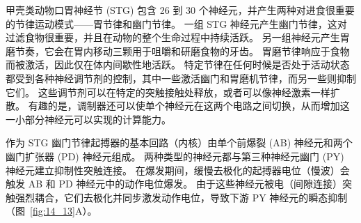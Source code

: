 甲壳类动物口胃神经节 (STG) 包含 26 到 30 个神经元，并产生两种对进食很重要的节律运动模式——胃节律和幽门节律。
一组 STG 神经元产生幽门节律，这对过滤食物很重要，并且在动物的整个生命过程中持续活跃。
另一组神经元产生胃磨节奏，它会在胃内移动三颗用于咀嚼和研磨食物的牙齿。
胃磨节律响应于食物而被激活，因此仅在体内间歇性地活跃。
特定节律在任何时候是否处于活动状态都受到各种神经调节剂的控制，其中一些激活幽门和胃磨机节律，而另一些则抑制它们。
这些调节剂可以在特定的突触接触处释放，或者可以像神经激素一样扩散。
有趣的是，调制器还可以使单个神经元在这两个电路之间切换，从而增加这一小部分神经元可以实现的计算能力。


作为 STG 幽门节律起搏器的基本回路（内核）由单个前爆裂 (AB) 神经元和两个幽门扩张器 (PD) 神经元组成。
两种类型的神经元都与第三种神经元幽门 (PY) 神经元建立抑制性突触连接。
在爆发期间，缓慢去极化的起搏器电位（慢波）会触发 AB 和 PD 神经元中的动作电位爆发。
由于这些神经元被电（间隙连接）突触强烈耦合，它们去极化并同步激发动作电位，导致下游 PY 神经元的瞬态抑制（图~\ref{fig:14_13}A）。


